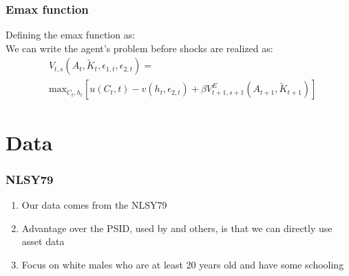 \documentclass{beamer}
\begin{document}
    \begin{frame}
      \frametitle{Emax function}
      Defining the emax function as:
      \begin{equation}
        \label{eq:emax}
        
      \end{equation}
      We can write the agent's problem before shocks are realized as:
      \begin{align*}
& V_{t,s}(A_t, \tilde{K}_t,\epsilon_{1,t},\epsilon_{2,t}) = \\ & \text{max}_{C_t, h_t} [u(C_t,t) - v(h_t, \epsilon_{2,t}) + \beta V^E_{t+1,s+1} (A_{t+1},\tilde{K}_{t+1})]
        \end{align*}
  \end{frame}
  
  \section{Data}

   \begin{frame}
    \frametitle{NLSY79}
    \begin{enumerate}
    \item Our data comes from the NLSY79
    \item Advantage over the PSID, used by \cite{MaCurdy1981-iy} and others, is that we can directly use asset data
    \item Focus on white males who are at least 20 years old and have some schooling
    \end{enumerate}
  \end{frame}
\end{document}
